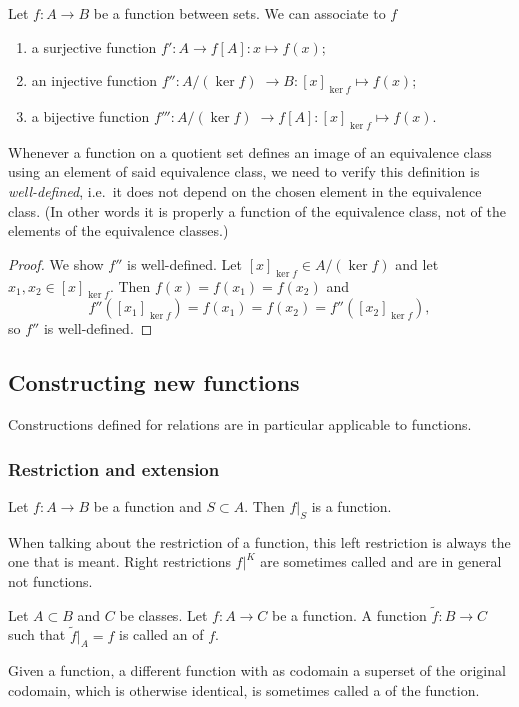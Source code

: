 \begin{proposition}
Let $f:A\to B$ be a function between sets. We can associate to $f$
\begin{enumerate}
\item a surjective function $f': A\to f[A]: x\mapsto f(x)$;
\item an injective function $f'': A/(\ker f) \;\to B: [x]_{\ker f}\mapsto f(x)$;
\item a bijective function $f''': A/(\ker f) \;\to f[A]: [x]_{\ker f}\mapsto f(x)$.
\end{enumerate}
\end{proposition}
Whenever a function on a quotient set defines an image of an equivalence class using an element of said equivalence class, we need to verify this definition is \emph{well-defined}, i.e.\ it does not depend on the chosen element in the equivalence class. (In other words it is properly a function of the equivalence class, not of the elements of the equivalence classes.)
\begin{proof}
We show $f''$ is well-defined. Let $[x]_{\ker f}\in A/(\ker f)$ and let $x_1,x_2\in [x]_{\ker f}$. Then $f(x) = f(x_1) = f(x_2)$ and
\[ f''([x_1]_{\ker f}) = f(x_1) = f(x_2) = f''([x_2]_{\ker f}), \]
so $f''$ is well-defined.
\end{proof}



\subsection{Constructing new functions}
Constructions defined for relations are in particular applicable to functions.

\subsubsection{Restriction and extension}
\begin{lemma}
Let $f: A\to B$ be a function and $S\subset A$. Then $f|_S$ is a function.
\end{lemma}
When talking about the restriction of a function, this left restriction is always the one that is meant. Right restrictions $f|^K$ are sometimes called  and are in general not functions.

\begin{definition}
Let $A\subset B$ and $C$ be classes. Let $f: A\to C$ be a function. A function $\tilde{f}: B\to C$ such that $\tilde{f}|_A = f$ is called an  of $f$.
\end{definition}
Given a function, a different function with as codomain a superset of the original codomain, which is otherwise identical, is sometimes called a  of the function.

